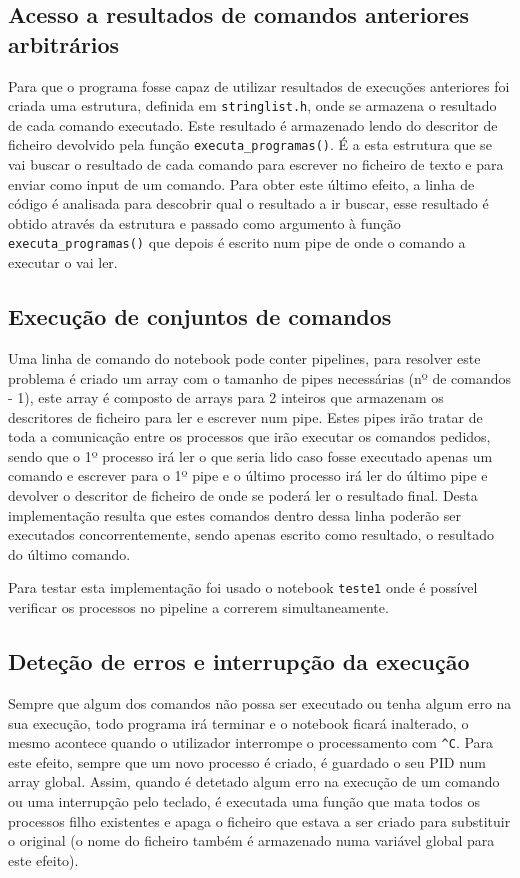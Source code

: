 \documentclass[a4paper]{article}
\begin{document}
\subsection{Acesso a resultados de comandos anteriores arbitrários}

Para que o programa fosse capaz de utilizar resultados de execuções anteriores foi criada uma estrutura, definida em \texttt{stringlist.h}, onde se armazena o resultado de cada comando executado. Este resultado é armazenado lendo do descritor de ficheiro devolvido pela função \texttt{executa\_programas()}.
É a esta estrutura que se vai buscar o resultado de cada comando para escrever no ficheiro de texto e para enviar como input de um comando. Para obter este último efeito, a linha de código é analisada para descobrir qual o resultado a ir buscar, esse resultado é obtido através da estrutura e passado como argumento à função \texttt{executa\_programas()} que depois é escrito num pipe de onde o comando a executar o vai ler.

\subsection{Execução de conjuntos de comandos}

Uma linha de comando do notebook pode conter pipelines, para resolver este problema é criado um array com o tamanho de pipes necessárias (nº de comandos - 1), este array é composto de arrays para 2 inteiros que armazenam os descritores de ficheiro para ler e escrever num pipe. Estes pipes irão tratar de toda a comunicação entre os processos que irão executar os comandos pedidos, sendo que o 1º processo irá ler o que seria lido caso fosse executado apenas um comando e escrever para o 1º pipe e o último processo irá ler do último pipe e devolver o descritor de ficheiro de onde se poderá ler o resultado final.
Desta implementação resulta que estes comandos dentro dessa linha poderão ser executados concorrentemente, sendo apenas escrito como resultado, o resultado do último comando.

Para testar esta implementação foi usado o notebook \texttt{teste1} onde é possível verificar os processos no pipeline a correrem simultaneamente.

\subsection{Deteção de erros e interrupção da execução}

Sempre que algum dos comandos não possa ser executado ou tenha algum erro na sua execução, todo programa irá terminar e o notebook ficará inalterado, o mesmo acontece quando o utilizador interrompe o processamento com \texttt{\^{}C}. Para este efeito, sempre que um novo processo é criado, é guardado o seu PID num array global. Assim, quando é detetado algum erro na execução de um comando ou uma interrupção pelo teclado, é executada uma função que mata todos os processos filho existentes e apaga o ficheiro que estava a ser criado para substituir o original (o nome do ficheiro também é armazenado numa variável global para este efeito).
\end{document}
